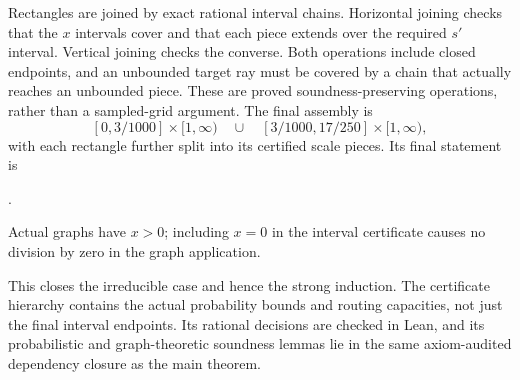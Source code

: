 Rectangles are joined by exact rational interval chains. Horizontal joining
checks that the $x$ intervals cover and that each piece extends over the
required $s'$ interval. Vertical joining checks the converse. Both operations
include closed endpoints, and an unbounded target ray must be covered by
a chain that actually reaches an unbounded piece. These are proved
soundness-preserving operations, rather than a sampled-grid argument.
The final assembly is
\[
 [0,3/1000]\times[1,\infty)\quad\cup\quad
 [3/1000,17/250]\times[1,\infty),
\]
with each rectangle further split into its certified scale pieces.
Its final statement is
\begin{center}.\end{center} Actual graphs have $x>0$;
including $x=0$ in the interval certificate causes no division by zero in
the graph application.

This closes the irreducible case and hence the strong induction. The
certificate hierarchy contains the actual probability bounds and routing
capacities, not just the final interval endpoints. Its rational decisions
are checked in Lean, and its probabilistic and graph-theoretic soundness
lemmas lie in the same axiom-audited dependency closure as the main theorem.
